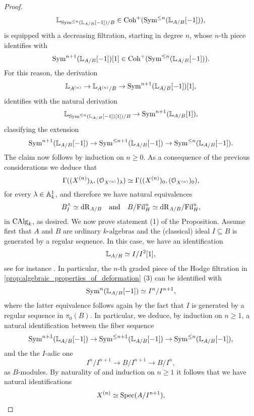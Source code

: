 \documentclass[10pt,a4paper,reqno]{amsart} %
\theoremstyle{plain}
\theoremstyle{definition}
\theoremstyle{remark}
\numberwithin{equation}{section}
\begin{document}
\begin{proof}
        \[
            \mathbb L_{\operatorname{Sym}^{\le n}(\mathbb L_{A/ B}[-1])/ B} \in \mathrm{Coh}^+(\operatorname{Sym}^{\le n}(\mathbb L_{A/ B}[-1])),
        \]  
    is equipped with a decreasing filtration, starting in degree $n$, whose $n$-th piece identifies with
        \[
            \operatorname{Sym}^{n+1}(\mathbb L_{A/ B}[-1])[1] \in \mathrm{Coh}^+(\operatorname{Sym}^{\le n}(\mathbb L_{A/ B}[-1])).  
        \]
    For this reason, the derivation
        \[
            \mathbb L_{A^{(n)}} \to \mathbb L_{A^{(n)}/ B} \to \operatorname{Sym}^{n+1}(\mathbb L_{A/ B}[-1])[1] ,
        \]
    identifies with the natural derivation
        \[
            \mathbb L_{\operatorname{Sym}^{\le n}(\mathbb L_{A/ B}[-1])[1])/ B} \to \operatorname{Sym}^{n+1}(\mathbb L_{A/ B} [1])  ,
        \]
    classifying the extension
        \[
            \operatorname{Sym}^{n+1}(\mathbb L_{A/ B}[-1]) \to \operatorname{Sym}^{\le n+1}(\mathbb L_{A/ B}[-1])   \to \operatorname{Sym}^{\le n}(\mathbb L_{A/ B}[-1]).
        \]
    The claim now follows by induction on $n \ge 0$.
    As a consequence of the previous considerations we deduce that
        \[
            \Gamma((X^{(n)})_\lambda, (\mathcal O_{X^{(n)}})_\lambda) \simeq \Gamma((X^{(n)})_0, (\mathcal O_{X^{(n)}})_0),
        \]
    for every $\lambda \in \mathbb A^1_k$, and therefore we have natural equivalences
        \[
            B^\wedge_I \simeq \mathrm{dR}_{A/ B} \quad \mathrm{and} \quad B/ \mathrm{Fil}_H^n \simeq \mathrm{dR}_{A/ B}/ \mathrm{Fil}^n_H,
        \]
    in $\mathrm{CAlg}_k$, as desired.
    We now prove statement (1) of the Proposition.
    Assume first that $A$ and $B$ are ordinary $k$-algebras and the (classical) ideal $I \subseteq B$
    is generated by a regular sequence.
    In this case, we have an identification
        \[
            \mathbb L_{A/ B} \simeq I/ I^2 [1],
        \]
    see for instance \cite[\href{https://stacks.math.columbia.edu/tag/08SJ}{Tag 08SJ}]{stacks-project}.
    In particular, the $n$-th graded piece of the Hodge filtration in \cref{prop:algebraic_properties_of_deformation} (3) can be identified with
        \[
            \operatorname{Sym}^n(\mathbb L_{A/ B}[-1]) \simeq I^n/ I^{n+1}, 
        \]
    where the latter equivalence follows again by the fact that $I$ is generated by a regular sequence in $\pi_0(B)$. In particular, we deduce, by induction on $n \ge 1$, a natural identification between
    the fiber sequence
        \[
            \operatorname{Sym}^{n+1}(\mathbb L_{A/ B}[-1]) \to \operatorname{Sym}^{\le n+1}(\mathbb L_{A/ B}[-1]) \to \operatorname{Sym}^{\le n}(\mathbb L_{A/ B}[-1]),
        \]
    and the the $I$-adic one
        \[  
            I^n/ I^{n+1} \to B/ I^{n+1} \to B/ I^n,
        \]
    as $B$-modules. By naturality of \cite[Theorem 9.5.1.3]{Gaitsgory_Study_II} and induction on $n \ge 1$ it follows that we have natural identifications
        \[
            X^{(n)} \simeq \operatorname{Spec} (A/ I^{n+1}) ,
\]
\end{proof}
\end{document}
